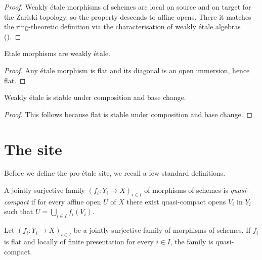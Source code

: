 \begin{proof}
    \leanok
    Weakly étale morphisms of schemes are local on source and on target for the Zariski topology,
    so the property descends to affine opens. There it matches the ring-theoretic definition
    via the characterisation of weakly étale algebras ().
\end{proof}

\begin{lemma}
    Etale morphisms are weakly étale.
    \label{lemma:etale-weakly-etale}
    \leanok
    \mathlibok
\end{lemma}

\begin{proof}
    \leanok
    Any étale morphism is flat and its diagonal is an open immersion, hence flat.
\end{proof}

\begin{lemma}
    Weakly étale is stable under composition and base change.
    \mathlibok
    \leanok
    \label{lemma:weakly-etale-stable}
\end{lemma}

\begin{proof}
    This follows because flat is stable under composition and base change.
    \leanok
\end{proof}

\section{The site}

Before we define the pro-étale site, we recall a few standard definitions.

\begin{definition}
    A jointly surjective family $(f_i \colon Y_i \to X)_{i \in I}$ of morphisms of schemes is
    \emph{quasi-compact} if for
    every affine open $U$ of $X$ there exist quasi-compact opens $V_i$ in $Y_i$ such that
    $U = \bigcup_{i \in  I} f_i(V_i)$.
    \mathlibok
    \label{def:qc-cover}
\end{definition}

\begin{lemma}
    Let $(f_i \colon Y_i \to X)_{i \in I}$ be a jointly-surjective family of morphisms of schemes.
    If $f_i$ is flat and locally of finite presentation for every $i \in I$,
    the family is quasi-compact.
    \label{lemma:qc-cover-of-flat-fp}
    \leanok
    \mathlibok
\end{lemma}

